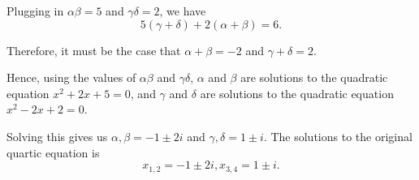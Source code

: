 \begin{enumerate}
    Plugging in \(\alpha\beta = 5\) and \(\gamma\delta = 2\), we have
    \[
    5(\gamma + \delta) + 2(\alpha + \beta) = 6.
    \]

    Therefore, it must be the case that \(\alpha + \beta = -2\) and \(\gamma + \delta = 2\).

    Hence, using the values of \(\alpha\beta\) and \(\gamma\delta\), \(\alpha\) and \(\beta\) are solutions to the quadratic equation \(x^2 + 2x + 5 = 0\), and \(\gamma\) and \(\delta\) are solutions to the quadratic equation \(x^2 - 2x + 2 = 0\).

    Solving this gives us \(\alpha, \beta = -1 \pm 2i\) and \(\gamma, \delta = 1 \pm i\). The solutions to the original quartic equation is
    \[
        x_{1, 2} = -1 \pm 2i, x_{3, 4} = 1 \pm i.
    \]
\end{enumerate}